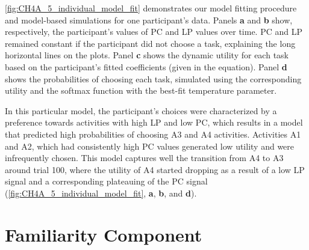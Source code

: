 \begin{subappendices}
\cref{fig:CH4A_5_individual_model_fit} demonstrates our model fitting procedure and model-based simulations for one participant’s data. Panels \textbf{a} and \textbf{b} show, respectively, the participant’s values of \acf{PC} and \acf{LP} values over time. \ac{PC} and \ac{LP} remained constant if the participant did not choose a task, explaining the long horizontal lines on the plots. Panel \textbf{c} shows the dynamic utility for each task based on the participant’s fitted coefficients (given in the equation). Panel \textbf{d} shows the probabilities of choosing each task, simulated using the corresponding utility and the softmax function with the best-fit temperature parameter. 

In this particular model, the participant’s choices were characterized by a preference towards activities with high \ac{LP} and low \ac{PC}, which results in a model that predicted high probabilities of choosing A3 and A4 activities. Activities A1 and A2, which had consistently high \ac{PC} values generated low utility and were infrequently chosen. This model captures well the transition from A4 to A3 around trial 100, where the utility of A4 started dropping as a result of a low \ac{LP} signal and a corresponding plateauing of the \ac{PC} signal (\cref{fig:CH4A_5_individual_model_fit}, \textbf{a}, \textbf{b}, and \textbf{d}).

\section{Familiarity Component}\label{CH4A_S_familiarity_component}


\end{subappendices}
